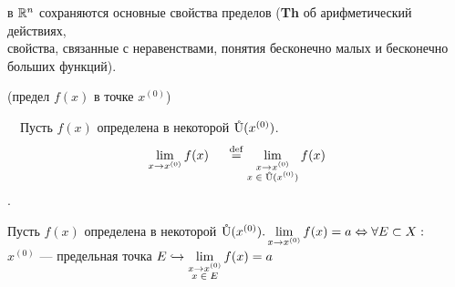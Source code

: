\parbox[t]{0.95\linewidth}{\Note в $\R^n$ сохраняются основные свойства пределов (\textbf{Th} об арифметический действиях, \\ свойства, связанные с неравенствами, понятия бесконечно малых и бесконечно больших функций).}

\Def (предел $f(x)$ в точке $x^{(0)}$)

~~Пусть $f(x)$ определена в некоторой $\Uo(x^{(0)})$. $$\lim\limits_{x \to x^{(0)}} f(x) \ \ \ \ \eqdef 
\lim\limits_{\substack {x \to x^{(0)} \\ x \; \in \; \Uo(x^{(0)}) }} f(x)$$.


\newpage

\Th{} \parbox[t]{0.95\linewidth}{ Пусть $f(x)$ определена в некоторой $\Uo(x^{(0)}).  \lim\limits_{x \to x^{(0)}} f(x) = a \Leftrightarrow \forall E \subset X : $ \\
$x^{(0)}$ --- предельная точка $E \holds \lim\limits_{\substack {x \to x^{(0)} \\ x \; \in \; E }} f(x) = a$ }

